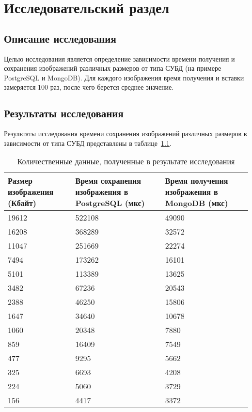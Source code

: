 \chapter{Исследовательский раздел}

\section{Описание исследования}

Целью исследования является определение зависимости времени получения и сохранения изображений различных размеров от типа СУБД (на примере PostgreSQL и MongoDB).
Для каждого изображения время получения и вставки замеряется 100 раз, после чего берется среднее значение.

\section{Результаты исследования}

Результаты исследования времени сохранения изображений различных размеров в зависимости от типа СУБД представлены в таблице~\ref{table:measure2}.
\begin{table}[!ht]
	\centering
	\caption{\label{table:measure2} Количественные данные, полученные в результате исследования}
	\begin{tabularx}{\textwidth}{|X|X|X|}
		\hline
		Размер изображения (Кбайт) & Время сохранения изображения в PostgreSQL (мкс) & Время получения изображения в MongoDB (мкс) \\ \hline
      	19612 & 522108 & 49090 \\ \hline
		16208 & 368289 & 32572 \\ \hline
		11047 & 251669 & 22274 \\ \hline
		7494 & 173262 & 16101 \\ \hline
		5101 & 113389 & 13625 \\ \hline
		3482 & 67236 & 20543 \\ \hline
		2388 & 46250 & 15806 \\ \hline
		1647 & 34640 & 10678 \\ \hline
		1060 & 20348 & 7880 \\ \hline
		859 & 16409 & 7549 \\ \hline
		477 & 9295 & 5662 \\ \hline
		325 & 6693 & 4208 \\ \hline
		224 & 5060 & 3729 \\ \hline
		156 & 4417 & 3372 \\ \hline
	\end{tabularx}
\end{table}

